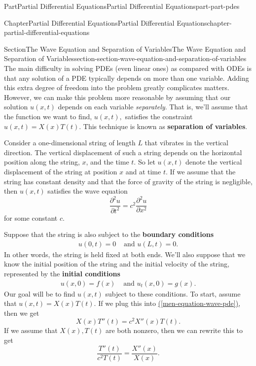 \documentclass[twoside,10pt,]{book}
\newcommand{\xreffont}{\relax}
\newcommand{\terminology}[1]{\textbf{#1}}
\numberwithin{equation}{part}
\newcommand{\amp}{&}
\begin{document}
\begin{partptx}{Part}{Partial Differential Equations}{}{Partial Differential Equations}{}{}{part-part-pdes}
\begin{chapterptx}{Chapter}{Partial Differential Equations}{}{Partial Differential Equations}{}{}{chapter-partial-differential-equations}
\begin{sectionptx}{Section}{The Wave Equation and Separation of Variables}{}{The Wave Equation and Separation of Variables}{}{}{section-section-wave-equation-and-separation-of-variables}
The main difficulty in solving PDEs (even linear ones) as compared with ODEs is that any solution of a PDE typically depends on more than one variable. Adding this extra degree of freedom into the problem greatly complicates matters. However, we can make this problem more reasonable by assuming that our solution \(u(x,t)\) depends on each variable \emph{separately}. That is, we'll assume that the function we want to find, \(u(x,t),\) satisfies the constraint \(u(x,t) = X(x)T(t)\). This technique is known as \terminology{separation of variables}.%
\par
Consider a one-dimensional string of length \(L\) that vibrates in the vertical direction. The vertical displacement of such a string depends on the horizontal position along the string, \(x\), and the time \(t\). So let \(u(x,t)\) denote the vertical displacement of the string at position \(x\) and at time \(t\). If we assume that the string has constant density and that the force of gravity of the string is negligible, then \(u(x,t)\) satisfies the wave equation%
\begin{equation}
\frac{\partial^{2}u}{\partial t^{2}} = c^{2}\frac{\partial^{2}u}{\partial x^{2}}\label{men-equation-wave-pde}
\end{equation}
for some constant \(c\).%
\par
Suppose that the string is also subject to the \terminology{boundary conditions}%
%
\begin{align}
u(0,t) = 0 \amp\text{ and } u(L,t) = 0\text{.}\label{mrow-equation-boundary-conditions}
\end{align}
In other words, the string is held fixed at both ends. We'll also suppose that we know the initial position of the string and the initial velocity of the string, represented by the \terminology{initial conditions}%
%
\begin{align}
u(x,0) = f(x) \amp \text{ and } u_{t}(x,0) = g(x) \text{.}\label{mrow-equation-initial-condition}
\end{align}
Our goal will be to find \(u(x,t)\) subject to these conditions. To start, assume that \(u(x,t) = X(x)T(t).\) If we plug this into \hyperref[men-equation-wave-pde]{({\xreffont\ref{men-equation-wave-pde}})}, then we get%
%
\begin{equation*}
X(x)T''(t) = c^{2}X''(x)T(t).
\end{equation*}
If we assume that \(X(x),T(t)\) are both nonzero, then we can rewrite this to get%
\begin{equation*}
\frac{T''(t)}{c^{2}T(t)} = \frac{X''(x)}{X(x)}.

\end{equation*}
\end{sectionptx}
\end{chapterptx}
\end{partptx}
\end{document}
